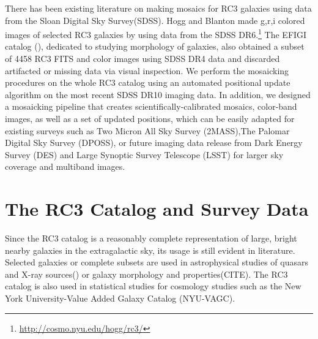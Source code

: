 \documentclass[5p]{elsarticle}
\begin{document}
\indent
There has been existing literature on making mosaics for RC3 galaxies using data from the Sloan Digital Sky Survey(SDSS). Hogg and Blanton made g,r,i colored images of selected RC3 galaxies by using data from the SDSS DR6.\footnote{\url{http://cosmo.nyu.edu/hogg/rc3/}} The EFIGI catalog (\citet{efigi}), dedicated to studying morphology of galaxies, also  obtained a subset of 4458 RC3 FITS and color images using SDSS DR4 data and discarded artifacted or missing data via visual inspection. We perform the mosaicking procedures on the whole RC3 catalog using an automated positional update algorithm on the most recent SDSS DR10 imaging data. In addition, we designed a mosaicking pipeline that creates scientifically-calibrated mosaics, color-band images, as well as a set of updated positions, which can be easily adapted for existing surveys such as Two Micron All Sky Survey  (2MASS),The Palomar Digital Sky Survey (DPOSS), or future imaging data release from  Dark Energy Survey (DES) and Large Synoptic Survey Telescope (LSST) for larger sky coverage and multiband images.
\section{The RC3 Catalog and Survey Data}
 Since the RC3 catalog 
 is a reasonably complete representation of large, bright nearby galaxies in the extragalactic sky, its 
usage is still evident in literature. Selected galaxies or complete subsets are used in astrophysical studies of  quasars and X-ray sources(\citet{xray}) or  galaxy morphology and properties(CITE).  The RC3 catalog is also used in statistical studies  for cosmology studies such as the New York University-Value Added Galaxy Catalog (NYU-VAGC).
\end{document}
